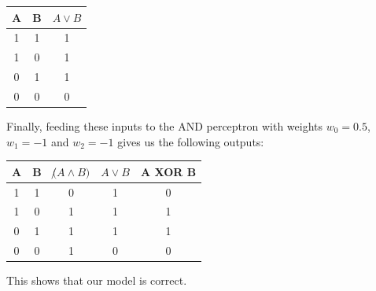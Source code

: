 \documentclass{article}
\begin{document}
\begin{table}[h!]
\centering
\begin{tabular}{c c c }
 A & B & $ A\lor B$\\
\hline
1&1&1\\
1&0&1\\
0&1&1\\
0&0&0
\end{tabular}
\end{table}

\pagebreak

Finally, feeding these inputs to the AND perceptron with weights $w_0 = 0.5$, $w_1 = -1$ and $w_2 = -1$ gives us the following outputs:

\begin{table}[h!]
\centering
\begin{tabular}{c c c c c}
 A & B & $ \not(A\land B)$& $ A \lor B$ & A XOR B\\
\hline
1&1&0 &1&0\\
1&0&1&1&1\\
0&1&1&1&1\\
0&0&1&0&0
\end{tabular}
\end{table}

This shows that our model is correct. 
\end{document}
